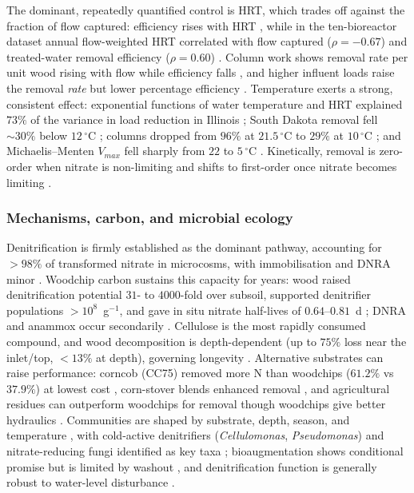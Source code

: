 \documentclass[11pt]{article}
\begin{document}
The dominant, repeatedly quantified control is HRT, which trades off against
the fraction of flow captured: efficiency rises with HRT
\parencite{Bell2015,Rivas2020}, while in the ten-bioreactor dataset annual
flow-weighted HRT correlated with flow captured ($\rho=-0.67$) and
treated-water removal efficiency ($\rho=0.60$)
\parencite{Christianson2026}. Column work shows removal rate per unit wood
rising with flow while efficiency falls \parencite{Greenan2009}, and higher
influent loads raise the removal \emph{rate} but lower percentage efficiency
\parencite{Rivas2020,Christianson2026,Zhang2021b}. Temperature exerts a
strong, consistent effect: exponential functions of water temperature and HRT
explained $73\%$ of the variance in load reduction in Illinois
\parencite{Bell2015}; South Dakota removal fell $\sim30\%$ below
$12\,^{\circ}$C \parencite{Thapa2023}; columns dropped from $96\%$ at
$21.5\,^{\circ}$C to $29\%$ at $10\,^{\circ}$C \parencite{Soupir2018}; and
Michaelis--Menten $V_{max}$ fell sharply from $22$ to $5\,^{\circ}$C
\parencite{Kouanda2021,Zhang2021b}. Kinetically, removal is zero-order when
nitrate is non-limiting and shifts to first-order once nitrate becomes
limiting \parencite{Hua2016,Kouanda2021}.

\subsubsection{Mechanisms, carbon, and microbial ecology}

Denitrification is firmly established as the dominant pathway, accounting for
$>98\%$ of transformed nitrate in microcosms, with immobilisation and DNRA
minor \parencite{Greenan2006,Greenan2009}. Woodchip carbon sustains this
capacity for years: wood raised denitrification potential $31$- to
$4000$-fold over subsoil, supported denitrifier populations $>10^8$~g$^{-1}$,
and gave in situ nitrate half-lives of $0.64$--$0.81$~d
\parencite{Moorman2010}; DNRA and anammox occur secondarily
\parencite{Hartfiel2022,Mendes2021}. Cellulose is the most rapidly consumed
compound, and wood decomposition is depth-dependent (up to $75\%$ loss near
the inlet/top, $<13\%$ at depth), governing longevity
\parencite{Hartfiel2022,Moorman2010,Ghane2018}. Alternative substrates can
raise performance: corncob (CC75) removed more N than woodchips ($61.2\%$ vs
$37.9\%$) at lowest cost \parencite{Law2023}, corn-stover blends enhanced
removal \parencite{Oladeji2023}, and agricultural residues can outperform
woodchips for removal though woodchips give better hydraulics
\parencite{Greenan2006,Kohn2023,Zhang2021b}. Communities are shaped by
substrate, depth, season, and temperature \parencite{Hartfiel2022}, with
cold-active denitrifiers (\textit{Cellulomonas}, \textit{Pseudomonas}) and
nitrate-reducing fungi identified as key taxa
\parencite{Anderson2020,Jang2019,Aldossari2021}; bioaugmentation shows
conditional promise but is limited by washout
\parencite{Jeglot2022,Wang2025b}, and denitrification function is generally
robust to water-level disturbance \parencite{Hathaway2017}.
\end{document}
